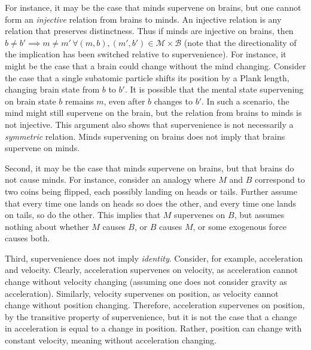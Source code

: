 \documentclass{article}
\providecommand{\mc}[1]{\mathcal{#1}}
\begin{document}
For instance, it may be the case that minds supervene on brains, but one cannot form an \emph{injective} relation from brains to minds.  An injective relation is any relation that preserves distinctness.  Thus if minds are injective on brains, then $b\neq b' \implies m \neq m' \, \forall (m,b), (m',b') \in \mc{M} \times \mc{B}$ (note that the directionality of the implication has been switched relative to supervenience). For instance, it might be the case that a brain could change without the mind changing.  Consider the case that a single subatomic particle shifts its position by a Plank length, changing brain state from $b$ to $b'$.  It is possible that the mental state supervening on brain state $b$ remains $m$, even after $b$ changes to $b'$.  In such a scenario, the mind might still supervene on the brain, but the relation from brains to minds is not injective. This argument also shows that supervenience is not necessarily a \emph{symmetric} relation.  Minds supervening on brains does not imply that brains supervene on minds.  


Second, it may be the case that minds supervene on brains, but that brains do not cause minds.  For instance, consider an analogy where $M$ and $B$ correspond to two coins being flipped, each possibly landing on heads or tails.  Further assume that every time one lands on heads so does the other, and every time one lands on tails, so do the other. This implies that $M$ supervenes on $B$, but assumes nothing about whether $M$ causes $B$, or $B$ causes $M$, or some exogenous force causes both.  


Third, supervenience does not imply \emph{identity}.  Consider, for example, acceleration and velocity.  Clearly, acceleration supervenes on velocity, as acceleration cannot change without velocity changing (assuming one does not consider gravity as acceleration).  Similarly, velocity supervenes on position, as velocity cannot change without position changing.  Therefore, acceleration supervenes on position, by the transitive property of supervenience, but it is not the case that a change in acceleration is equal to a change in position.  Rather, position can change with constant velocity, meaning without acceleration changing.  
\end{document}

